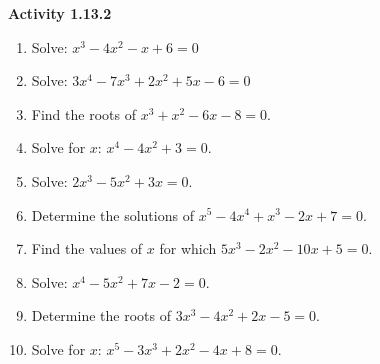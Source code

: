 \vspace{0.3ex}
\noindent\textbf{Activity 1.13.2}

\vspace{0.2ex}

\begin{enumerate}
    \item Solve: $x^3 - 4x^2 - x + 6 = 0$
    \item Solve: $3x^4 - 7x^3 + 2x^2 + 5x - 6 = 0$
    \item Find the roots of $x^3 + x^2 - 6x - 8 = 0$.
    \item Solve for $x$: $x^4 - 4x^2 + 3 = 0$.
    \item Solve: $2x^3 - 5x^2 + 3x = 0$.
    \item Determine the solutions of $x^5 - 4x^4 + x^3 - 2x + 7 = 0$.
    \item Find the values of $x$ for which $5x^3 - 2x^2 - 10x + 5 = 0$.
    \item Solve: $x^4 - 5x^2 + 7x - 2 = 0$.
    \item Determine the roots of $3x^3 - 4x^2 + 2x - 5 = 0$.
    \item Solve for $x$: $x^5 - 3x^3 + 2x^2 - 4x + 8 = 0$.
\end{enumerate}